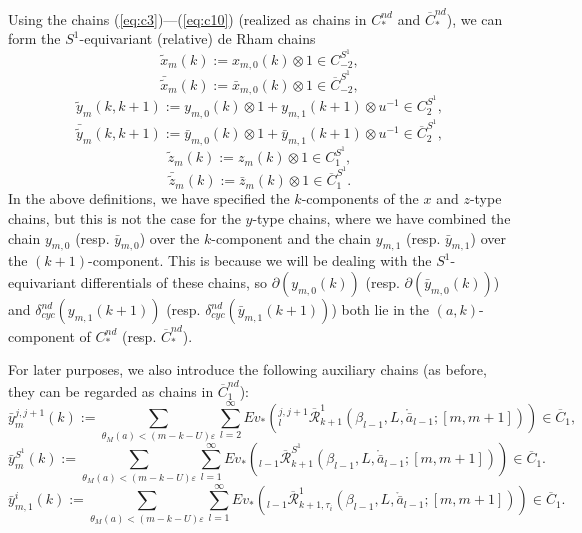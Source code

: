 \documentclass[a4paper]{article}
\numberwithin{equation}{section}
\begin{document}
Using the chains (\ref{eq:c3})---(\ref{eq:c10}) (realized as chains in $C_\ast^\mathit{nd}$ and $\overline{C}_\ast^\mathit{nd}$), we can form the $S^1$-equivariant (relative) de Rham chains
\begin{equation}\label{eq:t1}
\tilde{x}_m(k):=x_{m,0}(k)\otimes1\in C_{-2}^{S^1},
\end{equation}
\begin{equation}\label{eq:t2}
\bar{\tilde{x}}_m(k):=\bar{x}_{m,0}(k)\otimes1\in\overline{C}_{-2}^{S^1},
\end{equation}
\begin{equation}\label{eq:t3}
\tilde{y}_m(k,k+1):=y_{m,0}(k)\otimes1+y_{m,1}(k+1)\otimes u^{-1}\in C_2^{S^1},
\end{equation}
\begin{equation}\label{eq:t4}
\bar{\tilde{y}}_m(k,k+1):=\bar{y}_{m,0}(k)\otimes1+\bar{y}_{m,1}(k+1)\otimes u^{-1}\in \overline{C}_2^{S^1},
\end{equation}
\begin{equation}\label{eq:t5}
\tilde{z}_m(k):=z_m(k)\otimes1\in C_1^{S^1},
\end{equation}
\begin{equation}\label{eq:t6}
\bar{\tilde{z}}_m(k):=\bar{z}_m(k)\otimes1\in\overline{C}_1^{S^1}.
\end{equation}
In the above definitions, we have specified the $k$-components of the $x$ and $z$-type chains, but this is not the case for the $y$-type chains, where we have combined the chain $y_{m,0}$ (resp. $\bar{y}_{m,0}$) over the $k$-component and the chain $y_{m,1}$ (resp. $\bar{y}_{m,1}$) over the $(k+1)$-component. This is because we will be dealing with the $S^1$-equivariant differentials of these chains, so $\partial\left(y_{m,0}(k)\right)$ (resp. $\partial\left(\bar{y}_{m,0}(k)\right)$) and $\delta_\mathit{cyc}^\mathit{nd}\left(y_{m,1}(k+1)\right)$ (resp. $\delta_\mathit{cyc}^\mathit{nd}\left(\bar{y}_{m,1}(k+1)\right)$) both lie in the $(a,k)$-component of $C_\ast^\mathit{nd}$ (resp. $\overline{C}_\ast^\mathit{nd}$).

For later purposes, we also introduce the following auxiliary chains (as before, they can be regarded as chains in $\overline{C}_1^\mathit{nd}$):
\begin{equation}\label{eq:c11}
\bar{y}^{j,j+1}_m(k):=\sum_{\theta_M(a)<(m-k-U)\varepsilon}\sum_{l=2}^\infty\mathit{Ev}_\ast\left({}_l^{j,j+1}\overline{\mathcal{R}}_{k+1}^1(\beta_{l-1},L,\ring{\bar{a}}_{l-1};[m,m+1])\right)\in\overline{C}_1,
\end{equation}
\begin{equation}\label{eq:c12}
\bar{y}_m^{S^1}(k):=\sum_{\theta_M(a)<(m-k-U)\varepsilon}\sum_{l=1}^\infty\mathit{Ev}_\ast\left({}_{l-1}\overline{\mathcal{R}}_{k+1}^{S^1}(\beta_{l-1},L,\ring{\bar{a}}_{l-1};[m,m+1])\right)\in\overline{C}_1.
\end{equation}
\begin{equation}\label{eq:c13}
\bar{y}_{m,1}^i(k):=\sum_{\theta_M(a)<(m-k-U)\varepsilon}\sum_{l=1}^\infty\mathit{Ev}_\ast\left({}_{l-1}\overline{\mathcal{R}}_{k+1,\tau_i}^1(\beta_{l-1},L,\ring{\bar{a}}_{l-1};[m,m+1])\right)\in\overline{C}_1.
\end{equation}
\end{document}

